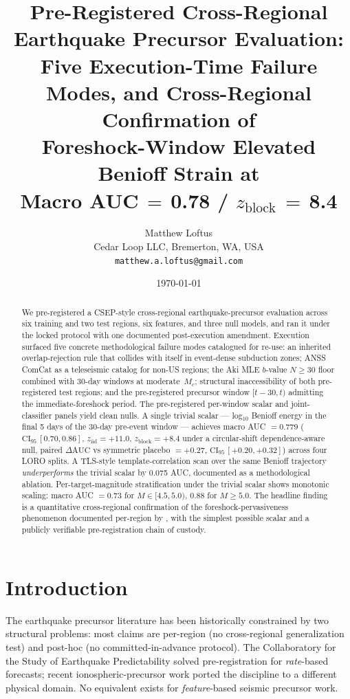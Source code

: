 \documentclass[11pt]{article}
\title{Pre-Registered Cross-Regional Earthquake Precursor Evaluation:\\
Five Execution-Time Failure Modes, and Cross-Regional Confirmation of\\
Foreshock-Window Elevated Benioff Strain at\\
Macro AUC$\,=\,$0.78 / $z_\mathrm{block}\,=\,$8.4}
\author{Matthew Loftus\\
\small Cedar Loop LLC, Bremerton, WA, USA\\
\small \texttt{matthew.a.loftus@gmail.com}}
\date{\today}
\begin{document}
\maketitle

\begin{abstract}
We pre-registered a CSEP-style cross-regional earthquake-precursor
evaluation across six training and two test regions, six features, and
three null models, and ran it under the locked protocol with one
documented post-execution amendment. Execution surfaced five concrete
methodological failure modes catalogued for re-use: an inherited
overlap-rejection rule that collides with itself in event-dense
subduction zones; ANSS ComCat as a teleseismic catalog for non-US
regions; the Aki MLE $b$-value $N{\ge}30$ floor combined with 30-day
windows at moderate~$M_c$; structural inaccessibility of both
pre-registered test regions; and the pre-registered precursor window
$[t-30, t)$ admitting the immediate-foreshock period. The pre-registered
per-window scalar and joint-classifier panels yield clean nulls. A
single trivial scalar — log$_{10}$ Benioff energy in the final 5 days
of the 30-day pre-event window — achieves macro AUC $= 0.779$
($\mathrm{CI}_{95}\,[0.70, 0.86]$, $z_\mathrm{iid} = +11.0$,
$z_\mathrm{block} = +8.4$ under a circular-shift dependence-aware null,
paired $\Delta\mathrm{AUC}$ vs symmetric placebo $= +0.27$,
$\mathrm{CI}_{95}\,[+0.20, +0.32]$) across four LORO splits. A
TLS-style template-correlation scan over the same Benioff trajectory
\emph{underperforms} the trivial scalar by 0.075 AUC, documented as a
methodological ablation. Per-target-magnitude stratification under the
trivial scalar shows monotonic scaling: macro AUC $= 0.73$ for
$M{\in}[4.5, 5.0)$, $0.88$ for $M{\ge}5.0$. The headline finding is a
quantitative cross-regional confirmation of the foreshock-pervasiveness
phenomenon documented per-region by \citet{trugman2019}, with the
simplest possible scalar and a publicly verifiable pre-registration
chain of custody.
\end{abstract}

\section{Introduction}
\label{sec:intro}

The earthquake precursor literature has been historically constrained by
two structural problems: most claims are per-region (no cross-regional
generalization test) and post-hoc (no committed-in-advance protocol).
The Collaboratory for the Study of Earthquake Predictability
\citep{schorlemmer2007, mizrahi2024} solved pre-registration for
\emph{rate}-based forecasts; recent ionospheric-precursor work
\citep{tao2025iono} ported the discipline to a different physical
domain. No equivalent exists for \emph{feature}-based seismic precursor
work.
\end{document}
